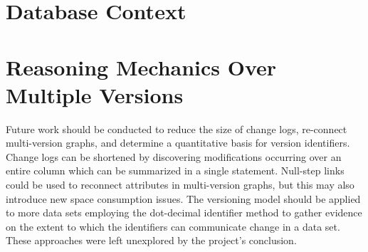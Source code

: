 \section{Database Context}

\section{Reasoning Mechanics Over Multiple Versions}

Future work should be conducted to reduce the size of change logs, re-connect multi-version graphs, and determine a quantitative basis for version identifiers.
Change logs can be shortened by discovering modifications occurring over an entire column which can be summarized in a single statement.
Null-step links could be used to reconnect attributes in multi-version graphs, but this may also introduce new space consumption issues.
The versioning model should be applied to more data sets employing the dot-decimal identifier method to gather evidence on the extent to which the identifiers can communicate change in a data set.
These approaches were left unexplored by the project's conclusion.